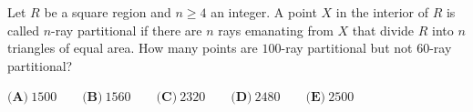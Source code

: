 Let $R$ be a square region and $n\ge4$ an integer. A point $X$ in the interior of $R$ is called $n$-ray partitional if there are $n$ rays emanating from $X$ that divide $R$ into $n$ triangles of equal area. How many points are $100$-ray partitional but not $60$-ray partitional?

$\textbf{(A)}\ 1500\qquad\textbf{(B)}\ 1560\qquad\textbf{(C)}\ 2320\qquad\textbf{(D)}\ 2480\qquad\textbf{(E)}\ 2500$
